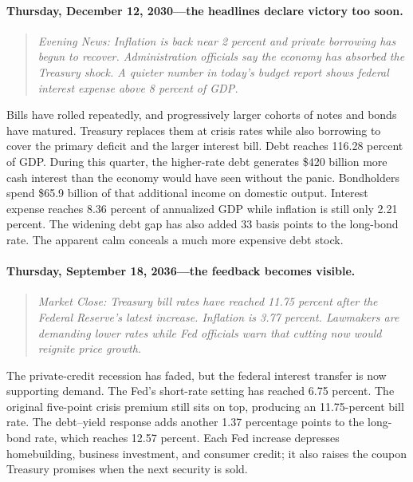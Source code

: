 \documentclass[11pt]{article}
\begin{document}
\paragraph{Thursday, December 12, 2030---the headlines declare victory too soon.}

\begin{quote}
\small\itshape
Evening News: Inflation is back near 2 percent and private borrowing has begun to recover.
Administration officials say the economy has absorbed the Treasury shock.  A quieter number
in today's budget report shows federal interest expense above 8 percent of GDP.
\end{quote}

Bills have rolled repeatedly, and progressively larger cohorts of notes and bonds have
matured.  Treasury replaces them at crisis rates while also borrowing to cover the primary
deficit and the larger interest bill.  Debt reaches 116.28 percent of GDP.  During this
quarter, the higher-rate debt generates \$420 billion more cash interest than the economy
would have seen without the panic.  Bondholders spend \$65.9 billion of that additional
income on domestic output.  Interest expense reaches 8.36 percent of annualized GDP while
inflation is still only 2.21 percent.  The widening debt gap has also added 33 basis points
to the long-bond rate.  The apparent calm conceals a much more expensive debt stock.

\paragraph{Thursday, September 18, 2036---the feedback becomes visible.}

\begin{quote}
\small\itshape
Market Close: Treasury bill rates have reached 11.75 percent after the Federal Reserve's
latest increase.  Inflation is 3.77 percent.  Lawmakers are demanding lower rates while Fed
officials warn that cutting now would reignite price growth.
\end{quote}

The private-credit recession has faded, but the federal interest transfer is now supporting
demand.  The Fed's short-rate setting has reached 6.75 percent.  The original five-point crisis
premium still sits on top, producing an 11.75-percent bill rate.  The debt--yield response
adds another 1.37 percentage points to the long-bond rate, which reaches 12.57 percent.  Each
Fed increase depresses homebuilding, business investment, and consumer credit; it also raises
the coupon Treasury promises when the next security is sold.
\end{document}
